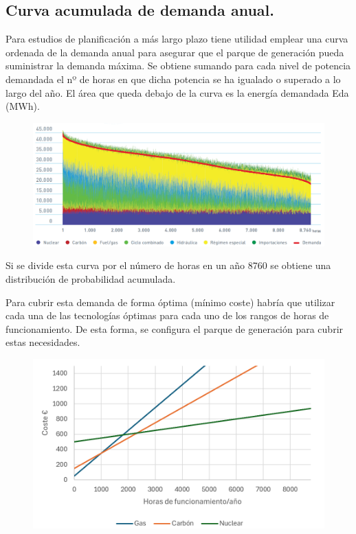 \subsection{Curva acumulada de demanda anual.}
Para estudios de planificación a más largo plazo tiene utilidad emplear una curva ordenada de la demanda anual para asegurar que el parque de generación pueda suministrar la demanda máxima. Se obtiene sumando para cada nivel de potencia demandada el nº de horas en que dicha potencia
se ha igualado o superado a lo largo del año. El área que queda debajo de la curva es la energía
demandada Eda (MWh).
\begin{figure}[H]
	\centering
	\includegraphics[width=0.7\linewidth]{res/tema4/curvaDemandaAnual}
	\label{fig:curvademandaanual}
\end{figure}
Si se divide esta curva por el número de horas en un año 8760 se obtiene una distribución de probabilidad acumulada. 



Para cubrir esta demanda de forma óptima (mínimo coste) habría que utilizar cada una de las tecnologías óptimas para cada uno de los rangos de horas de
funcionamiento. De esta forma, se configura el parque de generación para cubrir estas necesidades.
\begin{figure}[H]
	\centering
	\includegraphics[width=0.7\linewidth]{res/tema4/curvaCostes}
	\label{fig:curvacostes}
\end{figure}


